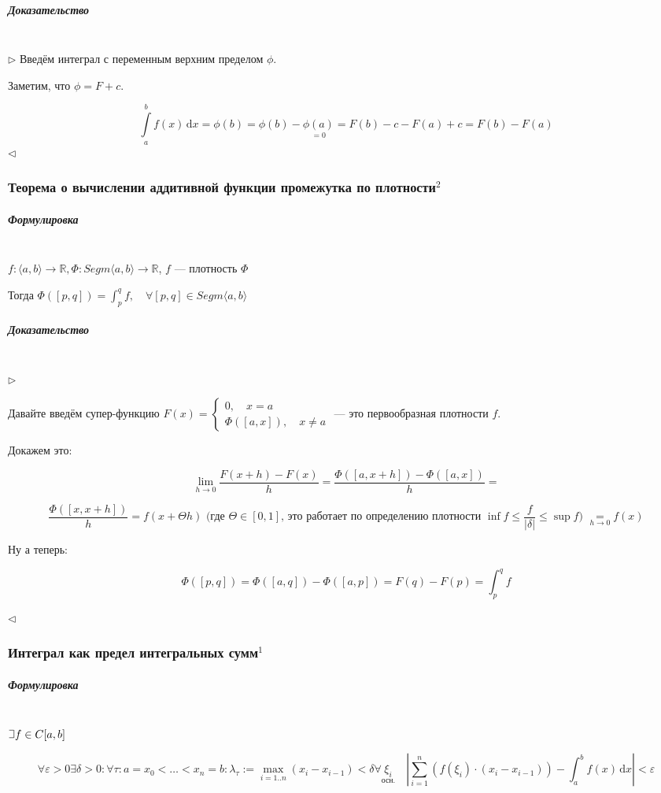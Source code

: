 \documentclass{article}
\def\letus{%
\mathord{\setbox0=\hbox{$\exists$}%
         \hbox{\kern 0.125\wd0%
               \vbox to \ht0{%
                  \hrule width 0.75\wd0%
                  \vfill%
                  \hrule width 0.75\wd0}%
               \vrule height \ht0%
               \kern 0.125\wd0}%
       }%
        }
\def\D{\,\mathrm{d}}
\let\vanillasubparagraph\subparagraph
\renewcommand{\subparagraph}[1]{\vanillasubparagraph{#1}\mbox{}\\}
\begin{document}
\subparagraph{Доказательство}
$\rhd$
Введём интеграл с переменным верхним пределом $\phi$.

Заметим, что $\phi = F + c$.

$$
\int\limits_a^b f(x)\D x = \phi(b) = \phi(b) - \underset{=0}{\phi(a)} = F(b) - c - F(a) + c = F(b) - F(a)
$$
$\lhd$

\subsubsection{Теорема о вычислении аддитивной функции промежутка по плотности\texorpdfstring{$^2$}{}}

\subparagraph{Формулировка}

$f: \langle a, b \rangle \rightarrow \mathbb{R},  \Phi: Segm\langle a, b\rangle \rightarrow \mathbb{R}$, $f$ --- плотность $\Phi$

Тогда $\Phi\left([p, q]\right) = \int_p^q f,\quad \forall [p, q] \in Segm\langle a, b\rangle$

\subparagraph{Доказательство}

$\rhd$

Давайте введём супер-функцию $F(x) = \begin{cases}
0, \quad x = a \\
\Phi([a, x]), \quad x \neq a
\end{cases}$ --- это первообразная плотности $f$.

Докажем это:

\[\lim_{h \rightarrow 0}{\frac{F(x + h) - F(x)}{h}} = \frac{\Phi([a, x + h]) - \Phi([a, x])}{h} =\]

\[\frac{\Phi([x, x + h])}{h} = f(x + \Theta h) \text{  (где $\Theta \in [0, 1]$, это работает по определению плотности $\inf f \le \frac{f}{|\delta|} \le \sup f$)  } \underset{h \rightarrow 0}{=}  f(x)\]

Ну а теперь:

\[\Phi([p, q]) = \Phi([a, q]) - \Phi([a, p]) = F(q) - F(p) = \int_p^q{f} \]

$\lhd$


\subsubsection{Интеграл как предел интегральных сумм\texorpdfstring{$^1$}{}}
\subparagraph{Формулировка}
$\letus f\in C[a, b]$

$$
\forall \varepsilon > 0 \exists \delta > 0 : \forall \tau: a = x_0 < \ldots < x_n = b : \lambda_\tau := \max_{i=1..n}(x_i - x_{i-1}) < \delta \forall \underset{\text{осн.}}{\xi_i} \quad \left|\sum_{i=1}^n (f(\xi_i) \cdot (x_i - x_{i-1})) - \int_a^b f(x) \D x\right| < \varepsilon
$$
\end{document}

